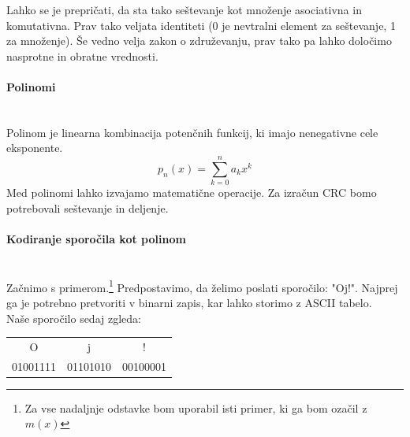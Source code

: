 \documentclass[12pt]{article}
\begin{document}
                Lahko se je prepričati, da sta tako seštevanje kot množenje
                asociativna in komutativna. Prav tako veljata identiteti (0 je 
                nevtralni element za seštevanje, 1 za množenje). Še vedno velja 
                zakon o združevanju, prav tako pa lahko določimo nasprotne in 
                obratne vrednosti. 
            
            \paragraph{Polinomi} \mbox{}\\
                Polinom je linearna kombinacija potenčnih funkcij, ki imajo 
                nenegativne cele eksponente.
                \begin{equation}
                    p_n (x) = \sum_{k=0}^n a_kx^k
                \end{equation}
                Med polinomi lahko izvajamo matematične operacije. Za izračun
                CRC bomo potrebovali seštevanje in deljenje. 
            
            \paragraph{Kodiranje sporočila kot polinom} \mbox{}\\
                Začnimo s primerom.\footnote{Za vse nadaljnje odstavke bom 
                uporabil isti primer, ki ga bom ozačil z $m(x)$} 
                Predpostavimo, da želimo poslati sporočilo: "Oj!". Najprej ga je
                potrebno pretvoriti v binarni zapis, kar lahko storimo z ASCII
                tabelo.\\
                Naše sporočilo sedaj zgleda:

                \begin{table}[h!]
                    \centering
                    \begin{tabular}{ccc}
                    O        & j        & !        \\
                    01001111 & 01101010 & 00100001
                    \end{tabular}
                \end{table}
\end{document}
